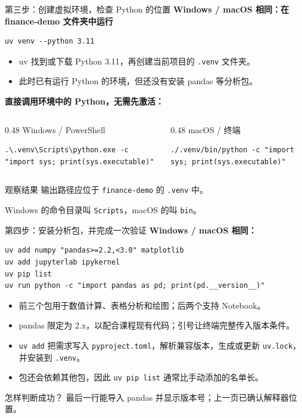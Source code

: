 \documentclass[9pt]{ctexbeamer}
\begin{document}
\begin{frame}[fragile]{第三步：创建虚拟环境，检查 Python 的位置}
  \textbf{Windows / macOS 相同：在 finance-demo 文件夹中运行}
\begin{lstlisting}[language={},numbers=none]
uv venv --python 3.11
\end{lstlisting}
  \begin{itemize}
    \item uv 找到或下载 Python 3.11，再创建当前项目的 \texttt{.venv} 文件夹。
    \item 此时已有运行 Python 的环境，但还没有安装 pandas 等分析包。
  \end{itemize}
  \textbf{直接调用环境中的 Python，无需先激活：}
  \begin{columns}[T,totalwidth=\textwidth]
    \begin{column}{0.48\textwidth}
      Windows / PowerShell
\begin{lstlisting}[language={},numbers=none,basicstyle=\ttfamily\scriptsize]
.\.venv\Scripts\python.exe -c "import sys; print(sys.executable)"
\end{lstlisting}
    \end{column}
    \begin{column}{0.48\textwidth}
      macOS / 终端
\begin{lstlisting}[language={},numbers=none,basicstyle=\ttfamily\scriptsize]
./.venv/bin/python -c "import sys; print(sys.executable)"
\end{lstlisting}
    \end{column}
  \end{columns}
  \begin{block}{观察结果}
    输出路径应位于 \texttt{finance-demo} 的 \texttt{.venv} 中。\par
    Windows 的命令目录叫 \texttt{Scripts}，macOS 的叫 \texttt{bin}。
  \end{block}
\end{frame}

\begin{frame}[fragile]{第四步：安装分析包，并完成一次验证}
  \textbf{Windows / macOS 相同：}
\begin{lstlisting}[language={},numbers=none]
uv add numpy "pandas>=2.2,<3.0" matplotlib
uv add jupyterlab ipykernel
uv pip list
uv run python -c "import pandas as pd; print(pd.__version__)"
\end{lstlisting}
  \begin{itemize}
    \item 前三个包用于数值计算、表格分析和绘图；后两个支持 Notebook。
    \item pandas 限定为 2.x，以配合课程现有代码；引号让终端完整传入版本条件。
    \item \texttt{uv add} 把需求写入 \texttt{pyproject.toml}，解析兼容版本，生成或更新 \texttt{uv.lock}，并安装到 \texttt{.venv}。
    \item 包还会依赖其他包，因此 \texttt{uv pip list} 通常比手动添加的名单长。
  \end{itemize}
  \begin{block}{怎样判断成功？}
    最后一行能导入 pandas 并显示版本号；上一页已确认解释器位置。
  \end{block}
\end{frame}
\end{document}
